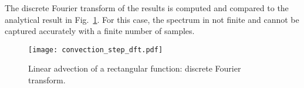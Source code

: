 The discrete Fourier transform of the results
is computed and compared to the analytical result in Fig.~\ref{fig:dft_step}.
For this case, the spectrum in not finite and cannot be captured accurately
with a finite number of samples.

\begin{figure}[htp]
  \centering
  \texttt{[image: convection\_step\_dft.pdf]}
  \caption{Linear advection of a rectangular function: 
  discrete Fourier transform.}
  \label{fig:dft_step}
\end{figure}